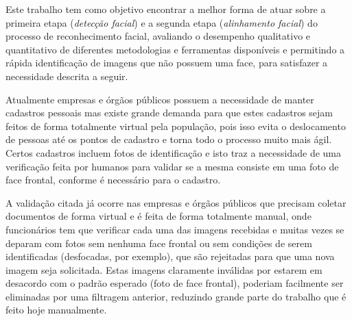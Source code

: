 Este trabalho tem como objetivo encontrar a melhor forma de atuar sobre a primeira etapa (\textit{detecção facial}) e a segunda etapa (\textit{alinhamento facial}) do processo de reconhecimento facial, avaliando o desempenho qualitativo e quantitativo de diferentes metodologias e ferramentas disponíveis e permitindo a rápida identificação de imagens que não possuem uma face, para satisfazer a necessidade descrita a seguir.

Atualmente empresas e órgãos públicos possuem a necessidade de manter cadastros pessoais mas existe grande demanda para que estes cadastros sejam feitos de forma totalmente virtual pela população, pois isso evita o deslocamento de pessoas até os pontos de cadastro e torna todo o processo muito mais ágil. Certos cadastros incluem fotos de identificação e isto traz a necessidade de uma verificação feita por humanos para validar se a mesma consiste em uma foto de face frontal, conforme é necessário para o cadastro.

A validação citada já ocorre nas empresas e órgãos públicos que precisam coletar documentos de forma virtual e é feita de forma totalmente manual, onde funcionários tem que verificar cada uma das imagens recebidas e muitas vezes se deparam com fotos sem nenhuma face frontal ou sem condições de serem identificadas (desfocadas, por exemplo), que são rejeitadas para que uma nova imagem seja solicitada. Estas imagens claramente inválidas por estarem em desacordo com o padrão esperado (foto de face frontal), poderiam facilmente ser eliminadas por uma filtragem anterior, reduzindo grande parte do trabalho que é feito hoje manualmente.